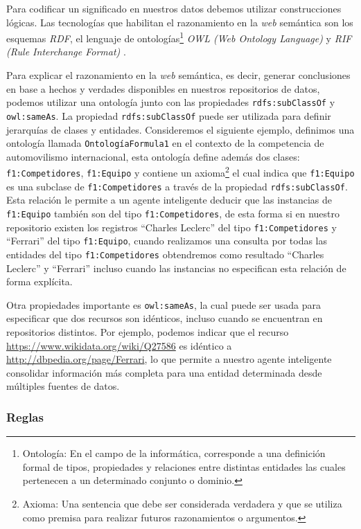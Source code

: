Para codificar un significado en nuestros datos debemos utilizar construcciones
lógicas. Las tecnologías que habilitan el razonamiento en la \textit{web}
semántica son los esquemas \textit{RDF}, el lenguaje de
ontologías\footnote{Ontología: En el campo de la informática, corresponde a una
definición formal de tipos, propiedades y relaciones entre distintas entidades
las cuales pertenecen a un determinado conjunto o dominio.} \textit{OWL (Web
Ontology Language)} \cite{antoniou2004web} y \textit{RIF (Rule Interchange
Format)} \cite{kifer2008rule}.

Para explicar el razonamiento en la \textit{web} semántica, es decir, generar
conclusiones en base a hechos y verdades disponibles en nuestros repositorios de
datos, podemos utilizar una ontología junto con las propiedades
\texttt{rdfs:subClassOf} y \texttt{owl:sameAs}. La propiedad
\texttt{rdfs:subClassOf} puede ser utilizada para definir jerarquías de clases y
entidades.
Consideremos el siguiente ejemplo, definimos una ontología llamada
\texttt{OntologíaFormula1} en el contexto de la competencia de automovilismo
internacional, esta ontología define además dos clases: \texttt{f1:Competidores},
\texttt{f1:Equipo} y contiene un axioma\footnote{Axioma: Una sentencia que debe
ser considerada verdadera y que se utiliza como premisa para realizar futuros
razonamientos o argumentos.} el cual indica que \texttt{f1:Equipo} es una
subclase de \texttt{f1:Competidores} a través de la propiedad
\texttt{rdfs:subClassOf}. Esta relación le permite a un agente inteligente
deducir que las instancias de \texttt{f1:Equipo} también son del tipo
\texttt{f1:Competidores}, de esta forma si en nuestro repositorio existen los
registros ``Charles Leclerc'' del tipo \texttt{f1:Competidores} y ``Ferrari''
del tipo \texttt{f1:Equipo}, cuando realizamos una consulta por todas las
entidades del tipo \texttt{f1:Competidores} obtendremos como resultado ``Charles
Leclerc'' y ``Ferrari'' incluso cuando las instancias no especifican esta
relación de forma explícita.

Otra propiedades importante es \texttt{owl:sameAs}, la cual puede ser usada para
especificar que dos recursos son idénticos, incluso cuando se encuentran en
repositorios distintos. Por ejemplo, podemos indicar que el recurso
\url{https://www.wikidata.org/wiki/Q27586} es idéntico a
\url{http://dbpedia.org/page/Ferrari}, lo que permite a nuestro agente
inteligente consolidar información más completa para una entidad determinada
desde múltiples fuentes de datos.

\subsubsection{Reglas}

